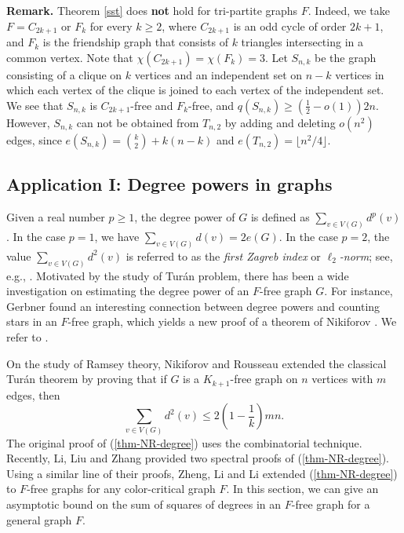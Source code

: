 \documentclass[11pt,a4paper]{article}
\theoremstyle{plain}
\theoremstyle{definition}
\begin{document}
\noindent 
{\bf Remark.}
Theorem \ref{sst} does {\bf not} hold for tri-partite graphs $F$. Indeed, we take $F=C_{2k+1}$ 
or $F_k$ for every $k\ge 2$, where $C_{2k+1}$ is an odd cycle of order $2k+1$, and $F_k$ is the friendship graph that consists of $k$ triangles intersecting in a common vertex. 
Note that $\chi (C_{2k+1})=\chi (F_k)=3$. 
Let $S_{n,k}$ be the graph consisting of a clique on $k$ vertices and an independent set on $n-k$ vertices in which each vertex of the clique is joined to each vertex of the independent set. 
We see that $S_{n,k}$ is $C_{2k+1}$-free and $F_k$-free, and $q(S_{n,k}) \ge (\frac{1}{2} - o(1))2n$. However, $S_{n,k}$ can not be obtained from 
$T_{n,2}$ by adding and deleting $o(n^2)$ edges, since  $e(S_{n,k})={k \choose 2} + k(n-k)$ and $e(T_{n,2})= \lfloor n^2/4 \rfloor$. 



\subsection{Application I: Degree powers in graphs}

 Given a real number $p\ge 1$, the degree power of $G$ is defined as $\sum_{v\in V(G)} d^p(v)$. 
 In the case $p=1$,
we have $\sum_{v\in V(G)} d(v) =2e(G)$.
In the case $p=2$, the value $\sum_{v\in V(G)} d^2(v)$ is referred to as the {\it first Zagreb index} or {\it $\ell_2$-norm}; see, e.g., \cite{LL2009-Zagreb}. 
Motivated by the study of Tur\'{a}n problem, there has been a wide investigation on estimating the degree power of an $F$-free graph $G$. 
For instance, Gerbner \cite{G2025} found an interesting connection between degree powers and counting stars in an $F$-free graph, which yields a new proof of a theorem of Nikiforov \cite{Niki2009-degree}.   
We refer to  \cite{BN2004,BN2012,CY2000,LLQ2019,Niki2009-degree,Zhang2022}.


On the study of Ramsey theory,
Nikiforov and Rousseau \cite{NR2004} extended the  classical Tur\'{a}n theorem by proving that if $G$ is a $K_{k+1}$-free graph on
$n$ vertices with $m$ edges, then
\begin{equation}    \label{thm-NR-degree}
\sum_{v\in V(G)} d^2(v) \le 2\left( 1-\frac{1}{k}\right)mn.
\end{equation}
The original proof of (\ref{thm-NR-degree}) uses the combinatorial technique.
Recently,  Li, Liu and Zhang \cite[Sec. 5.4]{LLZ2024-book-4-cycle} provided two spectral proofs of (\ref{thm-NR-degree}).
Using a similar line of their proofs, 
Zheng, Li and Li \cite{ZLL2025} extended (\ref{thm-NR-degree}) to $F$-free graphs for any color-critical graph $F$. In this section, 
we can give an asymptotic bound on the sum of squares of degrees in an $F$-free graph for a general graph $F$.
\end{document}
